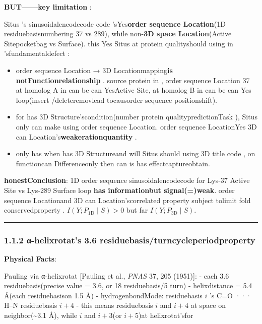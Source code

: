 \documentclass[
  12pt,
]{article}
\providecommand{\tightlist}{%
  \setlength{\itemsep}{0pt}\setlength{\parskip}{0pt}}
\begin{document}
\textbf{BUT------key limitation }: 

Situs 's sinusoidalencodecode code 'sYes\textbf{order sequence Location}(1D residuebasisnumbering 37 vs
289), while non-\textbf{3D space Location}(Active Sitepocketbag vs Surface). this Yes Situs
at protein qualityshould using in 'sfundamentaldefect : 

\begin{itemize}
\tightlist
\item
  order sequence Location → 3D Locationmapping\textbf{is notFunctionrelationship }. source protein in , order sequence Location 37
  at  homolog A in can be can YesActive Site, at  homolog B in can be can Yes
  loop(insert /deleteremovlead tocausorder sequence positionshift). 
\item
  for has  3D Structure'scondition(number protein qualitypredictionTask ), Situs
  only can make using order sequence Location. order sequence LocationYes 3D can Location's\textbf{weakerationquantity }. 
\item
  only has when has  3D Structureand will  Situs should using  3D
  title code , on  functioncan Differenceonly then can is has effectcaptureobtain. 
\end{itemize}

\textbf{honestConclusion}: 1D order sequence  sinusoidalencodecode for  Lys-37 Active Site vs Lys-289 Surface
loop \textbf{has informationbut signal(=)weak}. order sequence Locationand  3D can Location'scorrelated property subject tolimit fold
conservedproperty . \(I(Y; P_{\text{1D}} \mid S) > 0\) but far
\(I(Y; P_{\text{3D}} \mid S)\). 

\begin{center}\rule{0.5\linewidth}{0.5pt}\end{center}

\subsubsection{1.1.2 α-helixrotat's 3.6
residuebasis/turncycleperiodproperty }\label{ux3b1-ux87baux65cbux7684-3.6-ux6b8bux57faux5708ux5468ux671fux6027}

\textbf{Physical Facts}: 

Pauling via  α-helixrotat {[}Pauling et al., \emph{PNAS} 37, 205 (1951){]}:  -
each  3.6 residuebasis(precise value  = 3.6, or  18 residuebasis/5 turn) - helixdistance = 5.4
Å(each residuebasison  1.5 Å) - hydrogenbondMode: residuebasis \(i\) 's C=O ··· H--N residuebasis
\(i+4\) - this means residuebasis \(i\) and  \(i+4\) at space on neighbor(\textasciitilde3.1
Å), while  \(i\) and  \(i+3\)(or  \(i+5\))at helixrotat'sfor 
\end{document}
